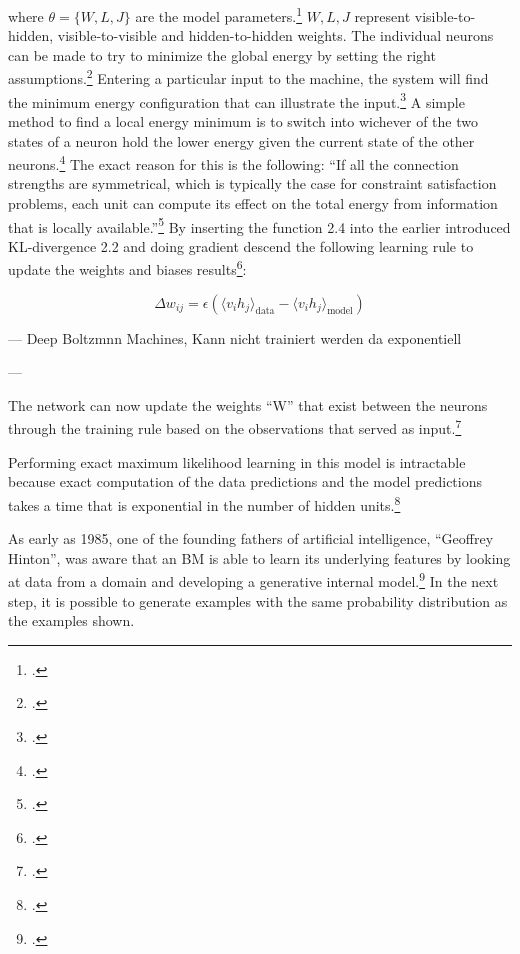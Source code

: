 where \( \theta = \{W, L, J\} \) are the model parameters.\footcite[Vgl.][448]{salakhutdinovDeepBoltzmannMachines2009}
\( W, L, J \) represent visible-to-hidden, visible-to-visible and hidden-to-hidden weights.
The individual neurons can be made to try to minimize the global energy by setting the right assumptions.\footcite[Vgl.][150]{ackleyLearningAlgorithmBoltzmann1985}
Entering a particular input to the machine, the system will find the minimum energy configuration that can illustrate the input.\footcite[Vgl.][150]{ackleyLearningAlgorithmBoltzmann1985}
A simple method to find a local energy minimum is to switch into wichever of the two states of a neuron hold the lower energy given the current state of the other neurons.\footcite[Vgl.][110]{fahlmanMassivelyParallelArchitectures1983}  
The exact reason for this is the following: ``If all the connection strengths are
symmetrical, which is typically the case for constraint satisfaction
problems, each unit can compute its effect on the total energy from
information that is locally available.''\footcite[110]{fahlmanMassivelyParallelArchitectures1983}  
By inserting the function 2.4 into the earlier introduced KL-divergence 2.2 and doing gradient descend the following learning rule to update the weights and biases results\footcite[Vgl.][5]{hintonPracticalGuideTraining2012}:

\begin{equation}
    \Delta w_{ij} = \epsilon ( \langle v_i h_j \rangle_{\text{data}} - \langle v_i h_j \rangle_{\text{model}} )
\end{equation}

---
Deep Boltzmnn Machines, Kann nicht trainiert werden da exponentiell

---

The network can now update the weights ``W'' that exist between the neurons through the training rule based on the observations that served as input.\footcite[Vgl.][1-2]{barraEquivalenceHopfieldNetworks2012}

Performing exact maximum likelihood learning in this model is intractable because exact computation of the data predictions and the model predictions takes a time that is exponential in the number of hidden units.\footcite[Vgl.][449]{salakhutdinovDeepBoltzmannMachines2009}

As early as 1985, one of the founding fathers of artificial intelligence, ``Geoffrey Hinton'', was aware that an \ac{BM} is able to learn its underlying features by looking at data from a domain and developing a generative internal model.\footcite[Vgl.][148]{ackleyLearningAlgorithmBoltzmann1985}
In the next step, it is possible to generate examples with the same probability distribution as the examples shown.



